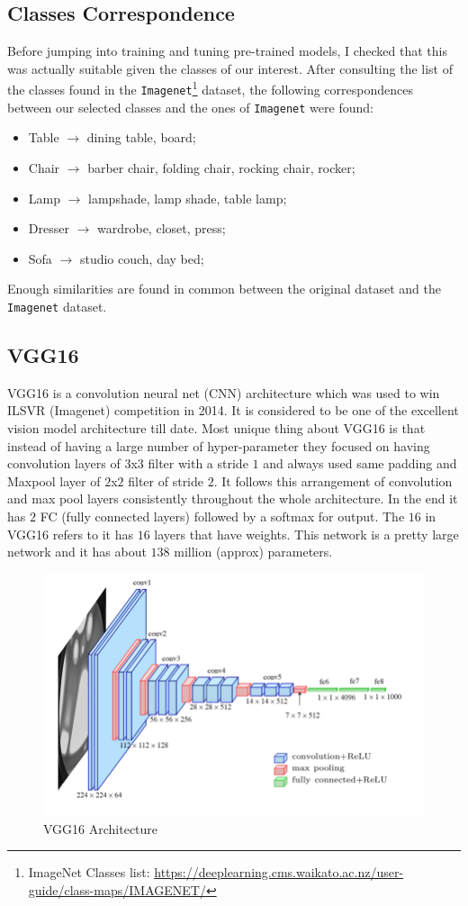 \documentclass[11pt,a4paper]{article}
\begin{document}
\subsection{Classes Correspondence}
Before jumping into training and tuning pre-trained models, I checked that this was actually suitable given the classes of our interest.
After consulting the list of the classes found in the \texttt{Imagenet}\footnote{ImageNet Classes list: \url{https://deeplearning.cms.waikato.ac.nz/user-guide/class-maps/IMAGENET/}} dataset, the following correspondences between our selected classes and the ones of \texttt{Imagenet} were found:
\begin{itemize}
    \item Table $\longrightarrow$ dining table, board;
    \item Chair $\longrightarrow$ barber chair, folding chair, rocking chair, rocker;
    \item Lamp $\longrightarrow$ lampshade, lamp shade, table lamp;
    \item Dresser $\longrightarrow$ wardrobe, closet, press;
    \item Sofa $\longrightarrow$ studio couch, day bed;
\end{itemize}
Enough similarities are found in common between the original dataset and the \texttt{Imagenet} dataset.
\subsection{VGG16}
VGG16 is a convolution neural net (CNN) architecture which was used to win ILSVR (Imagenet) competition in 2014. It is considered to be one of the excellent vision model architecture till date. Most unique thing about VGG16 is that instead of having a large number of hyper-parameter they focused on having convolution layers of $3$x$3$ filter with a stride $1$ and always used same padding and Maxpool layer of $2$x$2$ filter of stride $2$. It follows this arrangement of convolution and max pool layers consistently throughout the whole architecture. In the end it has $2$ FC (fully connected layers) followed by a softmax for output. The $16$ in VGG16 refers to it has $16$ layers that have weights. This network is a pretty large network and it has about $138$ million (approx) parameters.
\begin{figure}[H]
    \centering
    \includegraphics[scale=0.45]{imgs/vgg16.png}
    \caption{VGG16 Architecture}
\end{figure}
\end{document}
